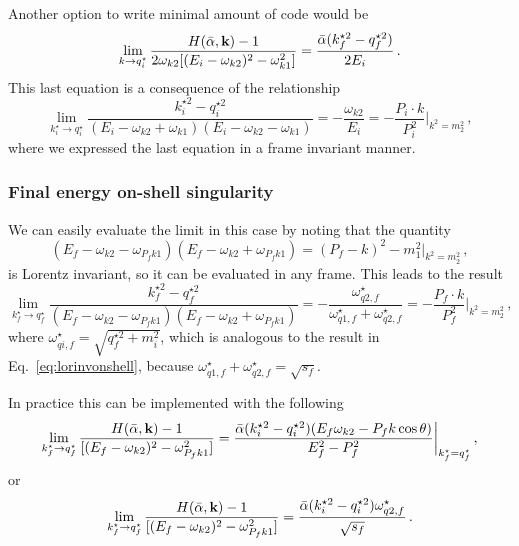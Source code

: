 \documentclass[aps,prd,onecolumn,groupedaddress]{revtex4-2}
\begin{document}
Another option to write minimal amount of code would be
\begin{equation}\label{eq:limitqist}
    \lim_{k\to q^\star_i}\frac{H(\bar{\alpha}, \textbf k) - 1}{2\omega_{k2}[(E_i-\omega_{k2})^2-\omega_{k1}^2]}
    = \frac{\bar \alpha (k^{\star 2}_f - q^{\star 2}_f)}{2E_i}\,.
\end{equation}
This last equation is a consequence of the relationship
\begin{equation}
     \lim_{k_i^\star\to q^\star_i}
  \frac{k_i^{\star2} - q^{\star 2}_i}{(E_i-\omega_{k2} + \omega_{k1})(E_i-\omega_{k2} - \omega_{k1})}
  = -\frac{\omega_{k2}}{E_i}=-\frac{P_i\cdot k}{P_i^2}\bigg  |_{k^2=m_2^2} \,,
  \label{eq:lorinvonshell}
\end{equation}
where we expressed the last equation in a frame invariant manner.

\subsubsection{Final energy on-shell singularity}

We can easily evaluate the limit in this case by noting that the quantity
\begin{equation}
    (E_f-\omega_{k2} - \omega_{P_fk1} )(E_f-\omega_{k2} + \omega_{P_fk1} )
    = (P_f-k)^2-m_1^2\bigg|_{k^2=m_2^2}\,,
\end{equation}
is Lorentz invariant, so it can be evaluated in any frame.
This leads to the result
\begin{equation}
    \lim_{k_f^\star\to q^\star_f}
  \frac{k_f^{\star2} - q^{\star 2}_f}{(E_f-\omega_{k2} - \omega_{P_fk1} )(E_f-\omega_{k2} + \omega_{P_fk1} )}
  = - \frac{\omega_{q2,f}^\star}{\omega_{q1,f}^\star+\omega_{q2,f}^\star}=-\frac{P_f\cdot k}{P_f^2}\bigg  |_{k^2=m_2^2}\,,
\end{equation}
where $\omega_{qi,f}^\star=\sqrt{q^{\star 2}_f+m_i^2}$, which is analogous to the result in Eq.~\eqref{eq:lorinvonshell}, because $\omega_{q1,f}^\star+\omega_{q2,f}^\star=\sqrt{s_f}$.

In practice this can be implemented with the following
\begin{equation}
        \lim_{k_f^\star\to q^\star_f}\frac{H(\bar{\alpha}, \textbf k) - 1}{[(E_f-\omega_{k2})^2-\omega_{P_fk1}^2]}
    = \frac{\bar \alpha (k^{\star 2}_i - q^{\star 2}_i)(E_f\omega_{k2}-P_fk\cos\theta)}{E_f^2-P_f^2}\bigg  |_{k_f^\star=q_f^\star} \,,
\end{equation}
or
\begin{equation}
        \lim_{k_f^\star\to q^\star_f}\frac{H(\bar{\alpha}, \textbf k) - 1}{[(E_f-\omega_{k2})^2-\omega_{P_fk1}^2]}
    = \frac{\bar \alpha (k^{\star 2}_i - q^{\star 2}_i)\omega_{q2,f}^\star}{\sqrt{s_f}}\,.
\end{equation}
\end{document}
